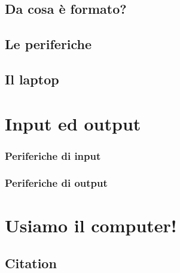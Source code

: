 \documentclass[12pt,fleqn,a4paper]{book} %
\begin{document}
    		
    		
    		\section{Da cosa è formato?}
    		\label{sec: Da cosa è formato?}
    		
    		\section{Le periferiche}
    		\label{sec: Le periferiche}
    		
    		\section{Il laptop}
    		\label{sec: Il laptop}
    		
    	\chapter{Input ed output}
    	\label{cap: Input ed output}
    		
    		\subsection{Periferiche di input}
    		\label{sub: Periferiche di input}
    		
    		\subsection{Periferiche di output}
    		\label{sub: Periferiche di output}
    		
    	\chapter{Usiamo il computer!}
    	\label{cap: Usiamo il computer!}
    		
    			
        
    
        \section{Citation}
    
\end{document}

